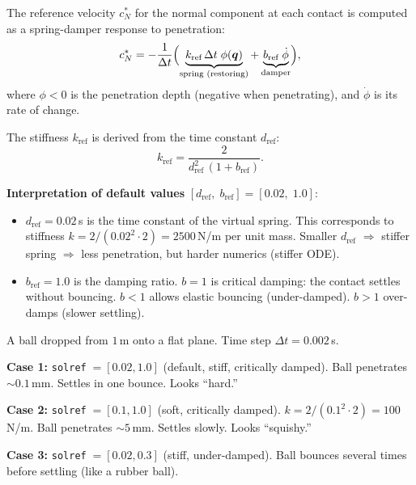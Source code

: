 \documentclass[11pt,twoside]{report}
\theoremstyle{definition}
\theoremstyle{plain}
\theoremstyle{remark}
\newcommand{\q}{\bm{q}}
\newcommand{\0}{\bm{0}}
\begin{document}
The reference velocity $c^{*}_{N}$ for the normal component at each contact
is computed as a spring-damper response to penetration:
\begin{equation}\label{eq:solref-math}
c^{*}_{N}=-\frac{1}{\Delta t}\Bigl(
\underbrace{k_{\text{ref}}\,\Delta t\;\phi(\q)}_{\text{spring (restoring)}}
+\underbrace{b_{\text{ref}}\;\dot\phi}_{\text{damper}}
\Bigr),
\end{equation}
where $\phi<0$ is the penetration depth (negative when penetrating),
and $\dot\phi$ is its rate of change.

The stiffness $k_{\text{ref}}$ is derived from the time constant $d_{\text{ref}}$:
\begin{equation}
k_{\text{ref}}=\frac{2}{d_{\text{ref}}^{2}\,(1+b_{\text{ref}})}.
\end{equation}

\textbf{Interpretation of default values} $[d_{\text{ref}},\;b_{\text{ref}}]=[0.02,\;1.0]$:
\begin{itemize}
\item $d_{\text{ref}}=0.02$\,s is the time constant of the virtual spring.
      This corresponds to stiffness $k=2/(0.02^{2}\cdot 2)=2500$\,N/m per unit mass.
      Smaller $d_{\text{ref}}$ $\Rightarrow$ stiffer spring $\Rightarrow$ less penetration,
      but harder numerics (stiffer ODE).
\item $b_{\text{ref}}=1.0$ is the damping ratio.
      $b=1$ is critical damping: the contact settles without bouncing.
      $b<1$ allows elastic bouncing (under-damped).
      $b>1$ over-damps (slower settling).
\end{itemize}

\begin{examplebox}
A ball dropped from $1$\,m onto a flat plane. Time step $\Delta t=0.002$\,s.

\textbf{Case 1:} \texttt{solref}$\;=[0.02, 1.0]$ (default, stiff, critically damped).
Ball penetrates ${\sim}0.1$\,mm. Settles in one bounce. Looks ``hard.''

\textbf{Case 2:} \texttt{solref}$\;=[0.1, 1.0]$ (soft, critically damped).
$k=2/(0.1^{2}\cdot 2)=100$\,N/m.
Ball penetrates ${\sim}5$\,mm. Settles slowly. Looks ``squishy.''

\textbf{Case 3:} \texttt{solref}$\;=[0.02, 0.3]$ (stiff, under-damped).
Ball bounces several times before settling (like a rubber ball).
\end{examplebox}
\end{document}
